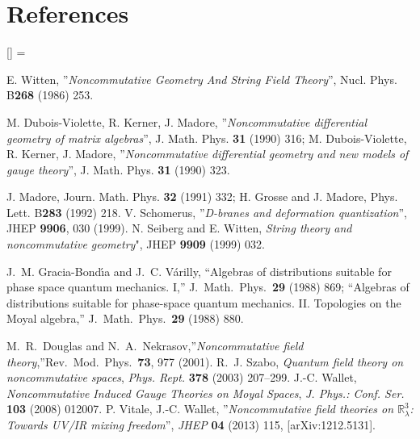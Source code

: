 \documentclass[a4paper,11pt]{article}
\numberwithin{equation}{section}
\renewenvironment{thebibliography}[1]
         {\section*{References}\frenchspacing\small
          \begin{list}{[\arabic{enumi}]}
         {\usecounter{enumi}\parsep=2pt\topsep 0pt
         \settowidth{\labelwidth}{[#1]}
         \leftmargin=\labelwidth\advance\leftmargin\labelsep
         \rightmargin=0pt\itemsep=1pt\sloppy}}{\end{list}}
\theoremstyle{nonumberplain}
\begin{document}
\begin{thebibliography}{50}




 E. Witten, ''{\it{Noncommutative Geometry And String Field Theory}}'', Nucl. Phys. B{\bf{268}} (1986) 253.

 M. Dubois-Violette, R. Kerner, J. Madore, ''{\it{Noncommutative differential geometry of matrix algebras}}'', J. Math. Phys. {\bf{31}} (1990) 316; M. Dubois-Violette, R. Kerner, J. Madore, ''{\it{Noncommutative differential geometry and new models of gauge theory}}'', J. Math. Phys. {\bf{31}} (1990) 323.

 J. Madore, Journ. Math. Phys. {\bf{32}} (1991) 332; H. Grosse and J. Madore, Phys. Lett. B{\bf{283}} (1992) 218. 
 V. Schomerus, ''{\it{D-branes and deformation quantization}}'', JHEP {\bf{9906}}, 030 (1999). N. Seiberg and E. Witten, {\it{String theory and noncommutative geometry}}", JHEP {\bf{9909}} (1999) 032.

J.~M. Gracia-Bond{\'\i}a and J.~C. V{\'a}rilly, ``Algebras of distributions suitable for phase space quantum mechanics. {I},'' J.\ Math.\ Phys.\ {\bf 29} (1988) 869; ``Algebras of distributions suitable for phase-space quantum mechanics. {II}. Topologies on the Moyal algebra,'' J.\ Math.\ Phys.\  {\bf 29} (1988) 880.

M.~R.~Douglas and N.~A.~Nekrasov,''{\it{Noncommutative field theory}},''Rev.\ Mod.\ Phys.\  {\bf 73}, 977 (2001). R.~J. Szabo, \textit{Quantum field theory on noncommutative spaces},
  \textit{Phys. Rept.} \textbf{378} (2003) 207--299.
J.-C. Wallet, \textit{{Noncommutative Induced Gauge Theories on Moyal Spaces}}, \textit{J. Phys.: Conf. Ser.} 
\textbf{103} (2008) 012007.
 P. Vitale, J.-C. Wallet, ''{\it{Noncommutative field theories on $\mathbb{R}^3_\lambda$: Towards UV/IR mixing freedom}}'', \textit{JHEP} \textbf{04} (2013) 115, [arXiv:1212.5131].




\end{thebibliography}
\end{document}
